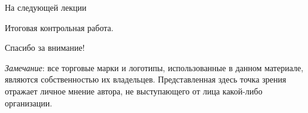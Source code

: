 \begin{frame}{На следующей лекции}

Итоговая контрольная работа.

\end{frame}

\begin{frame}

{\huge{Спасибо за внимание!}\par}

\vfill

\tiny{\textit{Замечание}: все торговые марки и логотипы, использованные в данном материале, являются собственностью их владельцев. Представленная здесь точка зрения отражает личное мнение автора, не выступающего от лица какой-либо организации.}

\end{frame}


